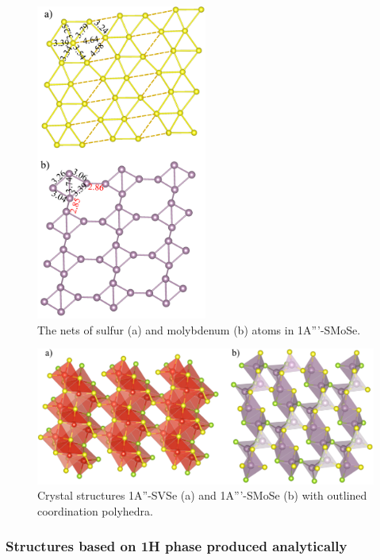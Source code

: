 \documentclass[a4paperm]{article}
\begin{document}
\begin{figure}[H]
	\includegraphics[width=0.5\textwidth]{airss3_smose.png}
	\caption{The nets of sulfur (a) and molybdenum (b) atoms in 1A'''-SMoSe.}
	\label{airss3_smose}
\end{figure}


\begin{figure}[H]
	\includegraphics[width=\textwidth]{airss3_poly.png}
	\caption{Crystal structures 1A''-SVSe (a) and 1A'''-SMoSe (b) with outlined coordination polyhedra.}
	\label{airss3_poly}
\end{figure}




\subsubsection{Structures based on 1H phase produced analytically }
\end{document}
